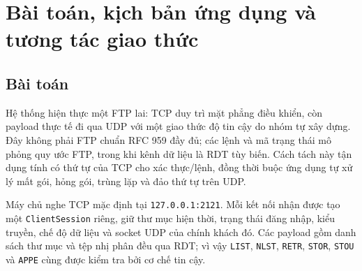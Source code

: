\section{Bài toán, kịch bản ứng dụng và tương tác giao thức}

\subsection{Bài toán}
Hệ thống hiện thực một FTP lai: TCP duy trì mặt phẳng điều khiển, còn payload thực tế đi qua UDP với một giao thức độ tin cậy do nhóm tự xây dựng. 
Đây không phải FTP chuẩn RFC 959 đầy đủ; các lệnh và mã trạng thái mô phỏng quy ước FTP, trong khi kênh dữ liệu là RDT tùy biến. 
Cách tách này tận dụng tính có thứ tự của TCP cho xác thực/lệnh, đồng thời buộc ứng dụng tự xử lý mất gói, hỏng gói, trùng lặp và đảo thứ tự trên UDP.

Máy chủ nghe TCP mặc định tại \texttt{127.0.0.1:2121}. 
Mỗi kết nối nhận được tạo một \texttt{ClientSession} riêng, giữ thư mục hiện thời, trạng thái đăng nhập, kiểu truyền, chế độ dữ liệu và socket UDP của chính khách đó. 
Các payload gồm danh sách thư mục và tệp nhị phân đều qua RDT; vì vậy \texttt{LIST}, \texttt{NLST}, \texttt{RETR}, \texttt{STOR}, \texttt{STOU} và \texttt{APPE} cùng được kiểm tra bởi cơ chế tin cậy.

